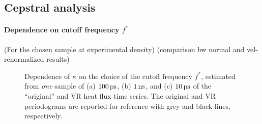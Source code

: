 

\subsection{Cepstral analysis}  \label{sec:results-class-cepstral}
\paragraph{Dependence on cutoff frequency $f^*$}
(For the chosen sample at experimental density)
(comparison bw normal and vel-renormalized results)

\begin{figure}[!tb]
    \centering
    \caption{Dependence of $\kappa$ on the choice of the cutoff frequency $f^*$, estimated from \emph{one} sample of (a) $100\,\mathrm{ps}$, (b) $1\,\mathrm{ns}$, and (c) $10\,\mathrm{ps}$ of the ``original'' and VR heat flux time series. 
    The original and VR periodograms are reported for reference with grey and black lines, respectively.}
    \label{fig:csilica-sample-expdens-fstar}
\end{figure}
